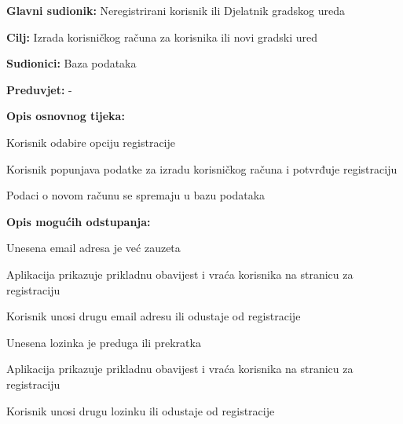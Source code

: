 				
				\noindent {}
				\begin{packed_item}
					
					\item \textbf{Glavni sudionik:} Neregistrirani korisnik ili Djelatnik gradskog ureda
					\item  \textbf{Cilj:} Izrada korisničkog računa za korisnika ili novi gradski ured
					\item  \textbf{Sudionici:} Baza podataka
					\item  \textbf{Preduvjet:} -
					
					\item  \textbf{Opis osnovnog tijeka:}
					\item[] \begin{packed_enum}
						\item Korisnik odabire opciju registracije
						\item Korisnik popunjava podatke za izradu korisničkog računa i potvrđuje registraciju
						\item Podaci o novom računu se spremaju u bazu podataka
					\end{packed_enum}
					
					\item  \textbf{Opis mogućih odstupanja:}
					\item[] \begin{packed_item}
						\item[2.a] Unesena email adresa je već zauzeta
						\item[] \begin{packed_enum}
							\item Aplikacija prikazuje prikladnu obavijest i vraća korisnika na stranicu za registraciju
							\item Korisnik unosi drugu email adresu ili odustaje od registracije
						\end{packed_enum}
						\item[2.b] Unesena lozinka je preduga ili prekratka
						\item[] \begin{packed_enum}
							\item Aplikacija prikazuje prikladnu obavijest i vraća korisnika na stranicu za registraciju
							\item Korisnik unosi drugu lozinku ili odustaje od registracije
						\end{packed_enum}
					\end{packed_item}
				\end{packed_item}
				
